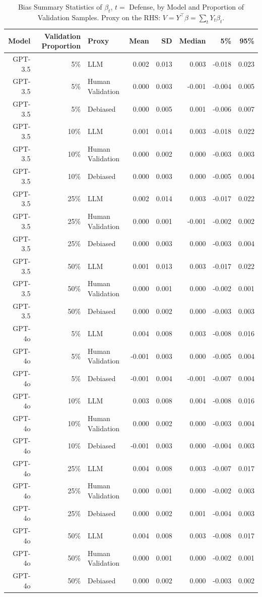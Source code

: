 \begin{table}

\caption{Bias Summary Statistics of $\beta_{t}$, $t=$ Defense, by Model and Proportion of Validation Samples.
      Proxy on the RHS: $V = Y^\top \beta = \sum_{t} Y_t \beta_t$.}
\centering
\begin{tabular}[t]{rrlrrrrr}
\toprule
Model & Validation Proportion & Proxy & Mean & SD & Median & 5\% & 95\%\\
\midrule
GPT-3.5 & 5\% & LLM & 0.002 & 0.013 & 0.003 & -0.018 & 0.023\\
GPT-3.5 & 5\% & Human Validation & 0.000 & 0.003 & -0.001 & -0.004 & 0.005\\
GPT-3.5 & 5\% & Debiased & 0.000 & 0.005 & 0.001 & -0.006 & 0.007\\
GPT-3.5 & 10\% & LLM & 0.001 & 0.014 & 0.003 & -0.018 & 0.022\\
GPT-3.5 & 10\% & Human Validation & 0.000 & 0.002 & 0.000 & -0.003 & 0.003\\
GPT-3.5 & 10\% & Debiased & 0.000 & 0.003 & 0.000 & -0.005 & 0.004\\
GPT-3.5 & 25\% & LLM & 0.002 & 0.014 & 0.003 & -0.017 & 0.022\\
GPT-3.5 & 25\% & Human Validation & 0.000 & 0.001 & -0.001 & -0.002 & 0.002\\
GPT-3.5 & 25\% & Debiased & 0.000 & 0.003 & 0.000 & -0.003 & 0.004\\
GPT-3.5 & 50\% & LLM & 0.001 & 0.013 & 0.003 & -0.017 & 0.022\\
GPT-3.5 & 50\% & Human Validation & 0.000 & 0.001 & 0.000 & -0.002 & 0.001\\
GPT-3.5 & 50\% & Debiased & 0.000 & 0.002 & 0.000 & -0.003 & 0.003\\
GPT-4o & 5\% & LLM & 0.004 & 0.008 & 0.003 & -0.008 & 0.016\\
GPT-4o & 5\% & Human Validation & -0.001 & 0.003 & 0.000 & -0.005 & 0.004\\
GPT-4o & 5\% & Debiased & -0.001 & 0.004 & -0.001 & -0.007 & 0.004\\
GPT-4o & 10\% & LLM & 0.003 & 0.008 & 0.004 & -0.008 & 0.016\\
GPT-4o & 10\% & Human Validation & 0.000 & 0.002 & 0.000 & -0.003 & 0.004\\
GPT-4o & 10\% & Debiased & -0.001 & 0.003 & 0.000 & -0.004 & 0.003\\
GPT-4o & 25\% & LLM & 0.004 & 0.008 & 0.003 & -0.007 & 0.017\\
GPT-4o & 25\% & Human Validation & 0.000 & 0.001 & 0.000 & -0.002 & 0.003\\
GPT-4o & 25\% & Debiased & 0.000 & 0.002 & 0.001 & -0.004 & 0.003\\
GPT-4o & 50\% & LLM & 0.004 & 0.008 & 0.003 & -0.008 & 0.017\\
GPT-4o & 50\% & Human Validation & 0.000 & 0.001 & 0.000 & -0.002 & 0.001\\
GPT-4o & 50\% & Debiased & 0.000 & 0.002 & 0.000 & -0.003 & 0.002\\
\bottomrule
\end{tabular}
\end{table}
